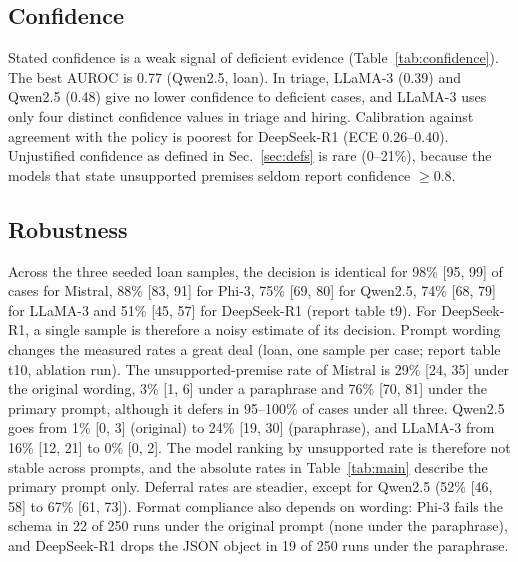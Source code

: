\subsection{Confidence}\label{sec:confidence}
\begin{table}[t]\centering\scriptsize\caption{Does stated confidence drop when inputs are deficient? AUROC of lower confidence for missing or contradictory inputs against the control (0.5 = no signal), and the number of distinct confidence values used.}\label{tab:confidence}
\end{table}
Stated confidence is a weak signal of deficient evidence (Table~\ref{tab:confidence}). The best AUROC is 0.77 (Qwen2.5, loan). In triage, LLaMA-3 (0.39) and Qwen2.5 (0.48) give no lower confidence to deficient cases, and LLaMA-3 uses only four distinct confidence values in triage and hiring. Calibration against agreement with the policy is poorest for DeepSeek-R1 (ECE 0.26--0.40). Unjustified confidence as defined in Sec.~\ref{sec:defs} is rare (0--21\%), because the models that state unsupported premises seldom report confidence $\ge 0.8$.

\subsection{Robustness}\label{sec:robustness}
Across the three seeded loan samples, the decision is identical for 98\% [95, 99] of cases for Mistral, 88\% [83, 91] for Phi-3, 75\% [69, 80] for Qwen2.5, 74\% [68, 79] for LLaMA-3 and 51\% [45, 57] for DeepSeek-R1 (report table t9). For DeepSeek-R1, a single sample is therefore a noisy estimate of its decision. Prompt wording changes the measured rates a great deal (loan, one sample per case; report table t10, ablation run). The unsupported-premise rate of Mistral is 29\% [24, 35] under the original wording, 3\% [1, 6] under a paraphrase and 76\% [70, 81] under the primary prompt, although it defers in 95--100\% of cases under all three. Qwen2.5 goes from 1\% [0, 3] (original) to 24\% [19, 30] (paraphrase), and LLaMA-3 from 16\% [12, 21] to 0\% [0, 2]. The model ranking by unsupported rate is therefore not stable across prompts, and the absolute rates in Table~\ref{tab:main} describe the primary prompt only. Deferral rates are steadier, except for Qwen2.5 (52\% [46, 58] to 67\% [61, 73]). Format compliance also depends on wording: Phi-3 fails the schema in 22 of 250 runs under the original prompt (none under the paraphrase), and DeepSeek-R1 drops the JSON object in 19 of 250 runs under the paraphrase.
